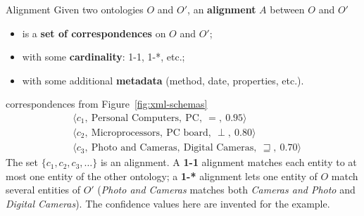 \begin{nbdef}{Alignment}
Given two ontologies $O$ and $O'$, an \textbf{alignment} $A$ between $O$ and $O'$
\begin{itemize}[nosep]
  \item is a \textbf{set of correspondences} on $O$ and $O'$;
  \item with some \textbf{cardinality}: 1-1, 1-*, etc.;
  \item with some additional \textbf{metadata} (method, date, properties, etc.).
\end{itemize}
\end{nbdef}

\begin{nbexample}{correspondences from Figure~\ref{fig:xml-schemas}}
\begin{align*}
  &\langle c_1,\ \text{Personal Computers},\ \text{PC},\ =,\ 0.95\rangle\\
  &\langle c_2,\ \text{Microprocessors},\ \text{PC board},\ \perp,\ 0.80\rangle\\
  &\langle c_3,\ \text{Photo and Cameras},\ \text{Digital Cameras},\ \sqsupseteq,\ 0.70\rangle
\end{align*}
The set $\{c_1, c_2, c_3, \ldots\}$ is an alignment. A \textbf{1-1} alignment matches each
entity to at most one entity of the other ontology; a \textbf{1-*} alignment lets one
entity of $O$ match several entities of $O'$ (\emph{Photo and Cameras} matches both
\emph{Cameras and Photo} and \emph{Digital Cameras}). The confidence values here are
invented for the example.
\end{nbexample}

\begin{center}
\label{fig:matching-process}
\end{center}

